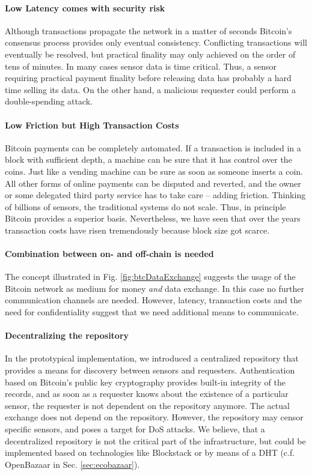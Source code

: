 \paragraph{Low Latency comes with security risk}

Although transactions propagate the network in a matter of seconds Bitcoin's consensus process provides only eventual consistency. Conflicting transactions will eventually be resolved, but practical finality may only achieved on the order of tens of minutes. In many cases sensor data is time critical. Thus, a sensor requiring practical payment finality before releasing data has probably a hard time selling its data. On the other hand, a malicious requester could perform a double-spending attack. 

\paragraph{Low Friction but High Transaction Costs}

Bitcoin payments can be completely automated. If a transaction is included in a block with sufficient depth, a machine can be sure that it has control over the coins. Just like a vending machine can be sure as soon as someone inserts a coin.  All other forms of online payments can be disputed and reverted, and the owner or some delegated third party service has to take care -- adding friction. Thinking of billions of sensors, the traditional systems do not scale. Thus, in principle Bitcoin provides a superior basis. Nevertheless, we have seen that over the years transaction costs have risen tremendously because block size got scarce.

\paragraph{Combination between on- and off-chain is needed}

The concept illustrated in Fig. \ref{fig:btcDataExchange} suggests the usage of the Bitcoin network as medium for money \emph{and} data exchange. In this case no further communication channels are needed. However, latency, transaction costs and the need for confidentiality suggest that we need additional means to communicate. 

\paragraph{Decentralizing the repository}
In the prototypical implementation, we introduced a centralized repository that provides a means for discovery between sensors and requesters. Authentication based on Bitcoin's public key cryptography provides built-in integrity of the records, and as soon as a requester knows about the existence of a particular sensor, the requester is not dependent on the repository anymore. The actual exchange does not depend on the repository. However, the repository may censor specific sensors, and poses a target for \ac{DoS} attacks. We believe, that a decentralized repository is not the critical part of the infrastructure, but could be implemented based on technologies like Blockstack \parencite{ali2016blockstack} or by means of a \ac{DHT} (c.f. OpenBazaar in Sec. \ref{sec:ecobazaar}).

